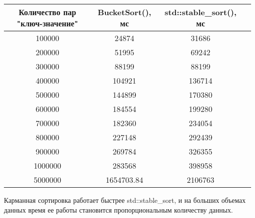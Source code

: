 \documentclass[12pt]{article}
\begin{document}
\begin{center}
\begin{tabular}{ |c|c|c|c| }
    \hline
    Количество пар "ключ-значение" & BucketSort(), мс & std::stable\_sort(), мс  \\
    \hline
    100000 & 24874 & 31686   \\
    200000 & 51995 & 69242   \\
    300000 & 88199 & 88199   \\
    400000 & 104921 & 136714  \\
    500000 & 144899 & 170380  \\
    600000 & 184554 & 199280   \\
    700000 & 182360 & 234054   \\
    800000 & 227148 & 292439   \\
    900000 & 269784 & 326355   \\
    1000000 & 283568 & 398958  \\
    5000000 & 1654703.84 & 2106763 \\


    \hline
    \end{tabular}
\end{center}

Карманная сортировка работает быстрее std::stable\_sort, и на больших объемах данных время ее работы становится пропорциональным 
количеству данных.
\end{document}
